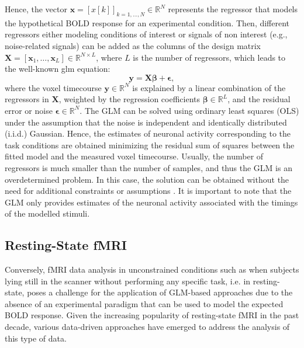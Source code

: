 Hence, the vector $\mathbf{x} = \left[x\left[k\right]\right]_{k=1,\dots,N} \in
\mathbb{R}^N $ represents the regressor that models the hypothetical BOLD
response for an experimental condition. Then, different regressors either
modeling conditions of interest or signals of non interest (e.g., noise-related
signals) can be added as the columns of the design matrix $\mathbf{X} =
\left[\mathbf{x}_1, \dots, \mathbf{x}_L\right] \in \mathbb{R}^{N\times L}$,
where $L$ is the number of regressors, which leads to the well-known
\acrshort*{glm} equation:
\begin{equation}
    \mathbf{y} = \mathbf{X} \mathbf{\beta} + \mathbf{\epsilon},
\end{equation}
where the voxel timecourse $\mathbf{y} \in \mathbb{R}^N$ is explained by a
linear combination of the regressors in $\mathbf{X}$, weighted by the regression
coefficients $\mathbf{\beta} \in \mathbb{R}^L$, and the residual error or noise
$\mathbf{\epsilon} \in \mathbb{R}^N$. The GLM can be solved using ordinary least
squares (OLS) under the assumption that the noise is independent and identically
distributed (i.i.d.) Gaussian. Hence, the estimates of neuronal activity
corresponding to the task conditions are obtained minimizing the residual sum of
squares between the fitted model and the measured voxel timecourse. Usually, the
number of regressors is much smaller than the number of samples, and thus the
GLM is an overdetermined problem. In this case, the solution can be obtained
without the need for additional constraints or assumptions
\citep{Henson2007CHAPTER14Convolution}. It is important to note that the GLM
only provides estimates of the neuronal activity associated with the timings of
the modelled stimuli.

\subsection{Resting-State fMRI}

Conversely, fMRI data analysis in unconstrained conditions such as when subjects
lying still in the scanner without performing any specific task, i.e. in
resting-state, poses a challenge for the application of GLM-based approaches due
to the absence of an experimental paradigm that can be used to model the
expected BOLD response. Given the increasing popularity of resting-state fMRI in
the past decade, various data-driven approaches have emerged to address the
analysis of this type of data. 

